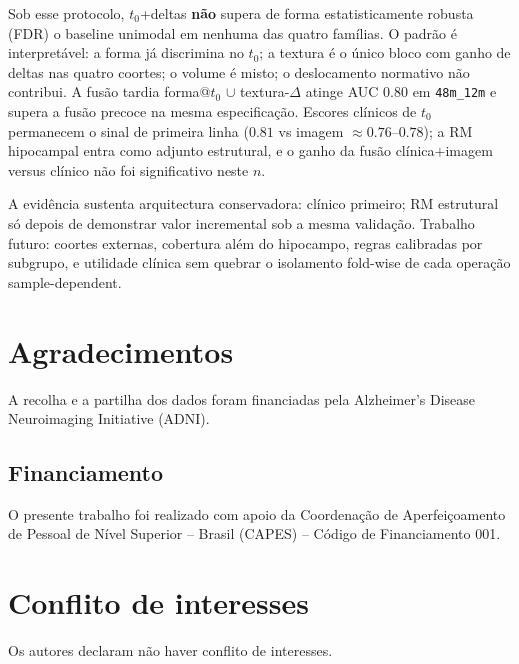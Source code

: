 \documentclass[review]{elsarticle}
\newcommand{\code}[1]{\texttt{#1}}
\begin{document}
Sob esse protocolo, $t_0$+deltas \textbf{não} supera de forma estatisticamente robusta (FDR) o baseline unimodal em nenhuma das quatro famílias.
O padrão é interpretável: a forma já discrimina no $t_0$; a textura é o único bloco com ganho de deltas nas quatro coortes; o volume é misto; o deslocamento normativo não contribui.
A fusão tardia forma@$t_0$ $\cup$ textura-$\Delta$ atinge AUC $0.80$ em \code{48m\_12m} e supera a fusão precoce na mesma especificação.
Escores clínicos de $t_0$ permanecem o sinal de primeira linha ($0.81$ vs imagem $\approx 0.76$--$0.78$); a RM hipocampal entra como adjunto estrutural, e o ganho da fusão clínica$+$imagem versus clínico não foi significativo neste $n$.

A evidência sustenta arquitectura conservadora: clínico primeiro; RM estrutural só depois de demonstrar valor incremental sob a mesma validação.
Trabalho futuro: coortes externas, cobertura além do hipocampo, regras calibradas por subgrupo, e utilidade clínica sem quebrar o isolamento fold-wise de cada operação sample-dependent.

	\section*{Agradecimentos}
	
	A recolha e a partilha dos dados foram financiadas pela Alzheimer's Disease Neuroimaging Initiative (ADNI).
	
	\subsection*{Financiamento}
	
	O presente trabalho foi realizado com apoio da Coordenação de Aperfeiçoamento de Pessoal de Nível Superior -- Brasil (CAPES) -- Código de Financiamento 001.
	
	\section*{Conflito de interesses}
	
	Os autores declaram não haver conflito de interesses.
	
	
	
\end{document}
